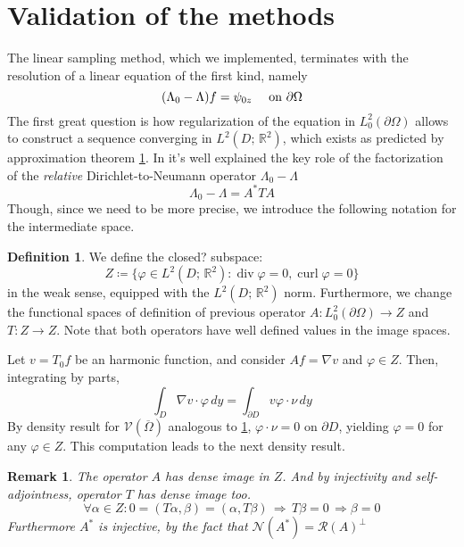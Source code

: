 \documentclass[10pt, a4paper, twoside, openright]{book}
\theoremstyle{definition}
\newtheorem{definition}[subsection]{Definition}
\theoremstyle{plain}
\theoremstyle{plain}
\theoremstyle{plain}
\theoremstyle{plain}
\newtheorem{remark}[subsection]{Remark}
\theoremstyle{plain}
\theoremstyle{plain}
\theoremstyle{plain}
\theoremstyle{plain}
\DeclareMathOperator{\divergence}{div}
\DeclareMathOperator{\curl}{curl}
\let\phi\varphi
\begin{document}
\section{Validation of the methods}
The linear sampling method, which we implemented, terminates with the resolution of a linear equation of the first kind, namely
\begin{equation}
\label{eq:NtoD_firstkind}
 (\Lambda_0 - \Lambda) f = \psi_{0z}\quad \textup{ on }\partial \Omega
\end{equation}
The first great question is how regularization of the equation in $L^2_0(\partial \Omega)$
allows to construct a sequence converging in $L^2(D;\,\mathbb{R}^2)$, which exists as predicted by approximation theorem \ref{}.
In \cite{arens:why} it's well explained the key role of the factorization 
of the \textit{relative} Dirichlet-to-Neumann operator $\Lambda_0 - \Lambda$
\begin{equation}
 \Lambda_0 - \Lambda = A^*TA
\end{equation}
Though, since we need to be more precise, we introduce the following notation for the intermediate space.
\begin{definition}
We define the closed? subspace:
\begin{equation}
 Z\coloneqq\bigl\{\phi\in L^2(D;\,\mathbb{R}^2):\divergence\phi=0, \curl\phi=0\bigr\}
\end{equation}
in the weak sense, equipped with the $L^2(D;\,\mathbb{R}^2)$ norm. Furthermore, we change the functional spaces of definition of previous operator $A:L^2_0(\partial \Omega)\to Z$ and $T:Z \to Z$. 
Note that both operators have well defined values in the image spaces.
\end{definition}
Let $v=T_0f$ be an harmonic function, and consider $Af=\nabla v$ and $\phi\in Z$. Then, integrating by parts,
\begin{equation}
 \int_D\nabla v\cdot \phi\,dy=\int_{\partial D}v \phi\cdot\nu\,dy
\end{equation}
By density result for $\mathcal{V}(\overline{\Omega})$ analogous to \ref{}, $\phi\cdot \nu=0$ on $\partial D$, yielding $\phi=0$ for any $\phi\in Z$.
This computation leads to the next density result.
\begin{remark}
 The operator $A$ has dense image in $Z$. And by injectivity and self-adjointness, operator $T$ has dense image too.
 \begin{equation}
  \forall\alpha\in Z: 0=(T\alpha,\beta)=(\alpha,T\beta)\,\Rightarrow \, T\beta = 0 \, \Rightarrow \beta=0
 \end{equation}
 Furthermore $A^*$ is injective, by the fact that $\mathcal{N}(A^*)=\mathcal{R}(A)^\perp$
\end{remark}
\end{document}
